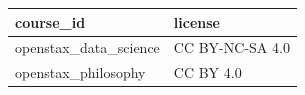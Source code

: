 \begin{tabular}{ll}
\toprule
course_id & license \\
\midrule
openstax_data_science & CC BY-NC-SA 4.0 \\
openstax_philosophy & CC BY 4.0 \\
\bottomrule
\end{tabular}
